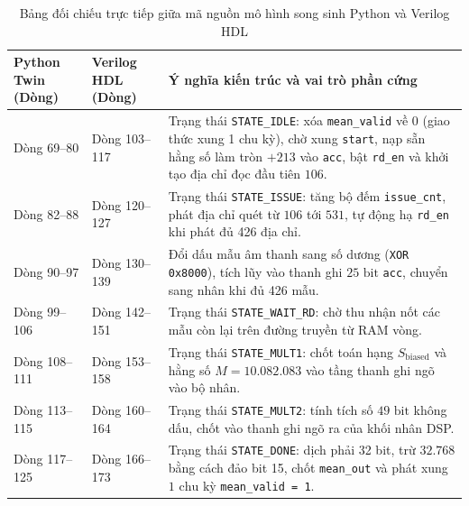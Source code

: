 \begin{table}[H]
\centering
\caption{Bảng đối chiếu trực tiếp giữa mã nguồn mô hình song sinh Python và Verilog HDL}
\label{tab:ch05_twin_vs_hdl}
\footnotesize
\begin{tabularx}{\textwidth}{p{2.6cm} p{2.6cm} X}
\toprule
\textbf{Python Twin (Dòng)} & \textbf{Verilog HDL (Dòng)} & \textbf{Ý nghĩa kiến trúc và vai trò phần cứng} \\
\midrule
Dòng 69--80 & Dòng 103--117 & Trạng thái \texttt{STATE\_IDLE}: xóa \texttt{mean\_valid} về $0$ (giao thức xung 1 chu kỳ), chờ xung \texttt{start}, nạp sẵn hằng số làm tròn $+213$ vào \texttt{acc}, bật \texttt{rd\_en} và khởi tạo địa chỉ đọc đầu tiên $106$. \\
\addlinespace[3pt]
Dòng 82--88 & Dòng 120--127 & Trạng thái \texttt{STATE\_ISSUE}: tăng bộ đếm \texttt{issue\_cnt}, phát địa chỉ quét từ $106$ tới $531$, tự động hạ \texttt{rd\_en} khi phát đủ 426 địa chỉ. \\
\addlinespace[3pt]
Dòng 90--97 & Dòng 130--139 & Đổi dấu mẫu âm thanh sang số dương (\texttt{XOR 0x8000}), tích lũy vào thanh ghi $25\text{ bit}$ \texttt{acc}, chuyển sang nhân khi đủ 426 mẫu. \\
\addlinespace[3pt]
Dòng 99--106 & Dòng 142--151 & Trạng thái \texttt{STATE\_WAIT\_RD}: chờ thu nhận nốt các mẫu còn lại trên đường truyền từ RAM vòng. \\
\addlinespace[3pt]
Dòng 108--111 & Dòng 153--158 & Trạng thái \texttt{STATE\_MULT1}: chốt toán hạng $S_{\text{biased}}$ và hằng số $M = 10.082.083$ vào tầng thanh ghi ngõ vào bộ nhân. \\
\addlinespace[3pt]
Dòng 113--115 & Dòng 160--164 & Trạng thái \texttt{STATE\_MULT2}: tính tích số $49\text{ bit}$ không dấu, chốt vào thanh ghi ngõ ra của khối nhân DSP. \\
\addlinespace[3pt]
Dòng 117--125 & Dòng 166--173 & Trạng thái \texttt{STATE\_DONE}: dịch phải 32 bit, trừ $32.768$ bằng cách đảo bit 15, chốt \texttt{mean\_out} và phát xung $1\text{ chu kỳ}$ \texttt{mean\_valid = 1}. \\
\bottomrule
\end{tabularx}
\end{table}


